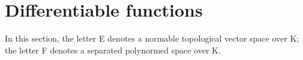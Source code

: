 \section{Differentiable functions}

In this section, the letter E denotes a normable topological vector space over K; the letter F denotes a separated polynormed space over K.

